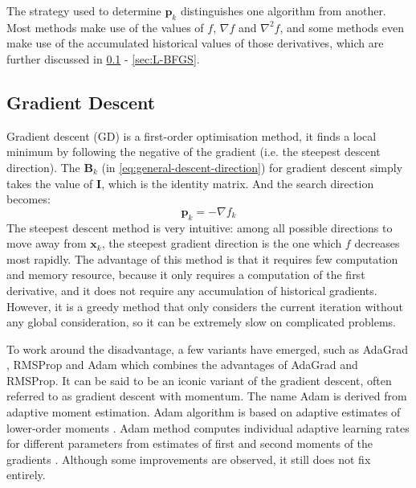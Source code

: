 The strategy used to determine $\textbf{p}_k$ distinguishes one algorithm from another. Most methods make use of the values of $f$, $\nabla f$ and $\nabla^2 f$, and some methods even make use of the accumulated historical values of those derivatives, which are further discussed in \cref{sec:GD} - \cref{sec:L-BFGS}.

\subsection{Gradient Descent}\label{sec:GD}
Gradient descent (GD) is a first-order optimisation method, it finds a local minimum by following the negative of the gradient (i.e. the steepest descent direction). The $\textbf{B}_k$ (in \cref{eq:general-descent-direction}) for gradient descent simply takes the value of $\textbf{I}$, which is the identity matrix. And the search direction becomes:
\begin{equation}
  \textbf{p}_k = -\nabla f_k
\end{equation}
The steepest descent method is very intuitive: among all possible directions to move away from $\textbf{x}_{k}$, the steepest gradient direction is the one which $f$ decreases most rapidly. The advantage of this method is that it requires few computation and memory resource, because it only requires a computation of the first derivative, and it does not require any accumulation of historical gradients. However, it is a greedy method that only considers the current iteration without any global consideration, so it can be extremely slow on complicated problems. \cite{Nocedal2006}

To work around the disadvantage, a few variants have emerged, such as AdaGrad \cite{Duchi2011}, RMSProp \cite{Tieleman2012} and Adam \cite{Kingma2015} which combines the advantages of AdaGrad and RMSProp. It can be said to be an iconic variant of the gradient descent, often referred to as gradient descent with momentum. The name Adam is derived from adaptive moment estimation. Adam algorithm is based on adaptive estimates of lower-order moments \cite{Kingma2015}. Adam method computes individual adaptive learning rates for different parameters from estimates of first and second moments of the gradients \cite{Kingma2015}. Although some improvements are observed, it still does not fix entirely.


